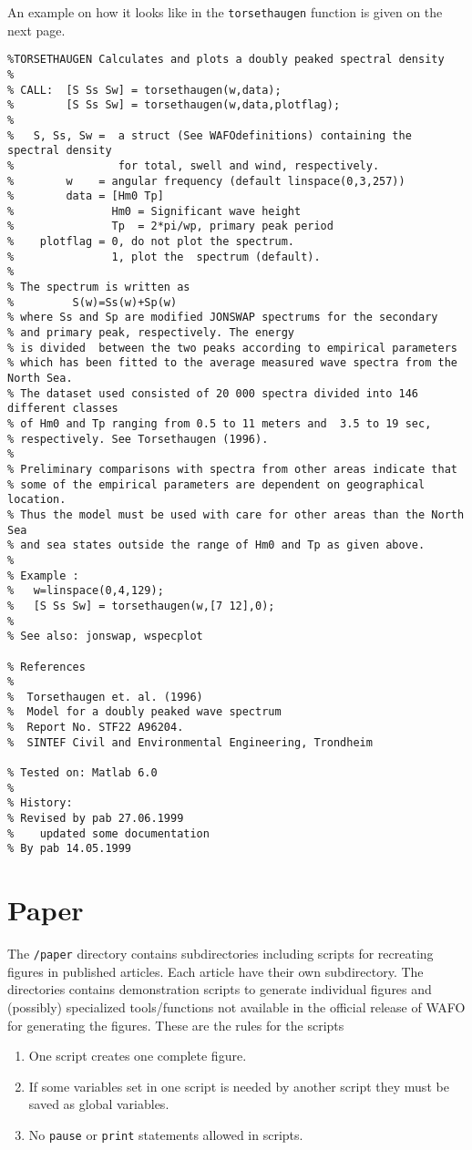 \documentclass[10pt,a4paper]{article}   %
\begin{document}
An example on how it looks like in the \verb+torsethaugen+ function is given
on the next page.
\newpage{}
\begin{verbatim}
%TORSETHAUGEN Calculates and plots a doubly peaked spectral density 
%
% CALL:  [S Ss Sw] = torsethaugen(w,data); 
%        [S Ss Sw] = torsethaugen(w,data,plotflag); 
%
%   S, Ss, Sw =  a struct (See WAFOdefinitions) containing the spectral density 
%                for total, swell and wind, respectively.  
%        w    = angular frequency (default linspace(0,3,257))
%        data = [Hm0 Tp]
%               Hm0 = Significant wave height
%               Tp  = 2*pi/wp, primary peak period
%    plotflag = 0, do not plot the spectrum.
%               1, plot the  spectrum (default).
%
% The spectrum is written as
%         S(w)=Ss(w)+Sp(w) 
% where Ss and Sp are modified JONSWAP spectrums for the secondary 
% and primary peak, respectively. The energy
% is divided  between the two peaks according to empirical parameters
% which has been fitted to the average measured wave spectra from the North Sea.
% The dataset used consisted of 20 000 spectra divided into 146 different classes 
% of Hm0 and Tp ranging from 0.5 to 11 meters and  3.5 to 19 sec,
% respectively. See Torsethaugen (1996).
%
% Preliminary comparisons with spectra from other areas indicate that 
% some of the empirical parameters are dependent on geographical location.
% Thus the model must be used with care for other areas than the North Sea 
% and sea states outside the range of Hm0 and Tp as given above.
%
% Example : 
%   w=linspace(0,4,129);
%   [S Ss Sw] = torsethaugen(w,[7 12],0); 
%
% See also: jonswap, wspecplot

% References 
% 
%  Torsethaugen et. al. (1996)
%  Model for a doubly peaked wave spectrum 
%  Report No. STF22 A96204. 
%  SINTEF Civil and Environmental Engineering, Trondheim

% Tested on: Matlab 6.0
% 
% History:
% Revised by pab 27.06.1999
%    updated some documentation
% By pab 14.05.1999
\end{verbatim}
\section{Paper}
The \verb+/paper+ directory contains subdirectories including scripts for recreating figures in 
published articles. Each article have their own subdirectory.  The directories contains 
demonstration scripts to 
generate individual figures and (possibly) specialized tools/functions not available in the official 
release of WAFO for generating the figures. These are the rules for the scripts 
\begin{enumerate}
\item One script creates one complete figure.
\item If some variables set in one script is needed by another script they must be saved as global variables.
\item No \verb+pause+ or \verb+print+ statements allowed in scripts.
\end{enumerate}
\end{document}
